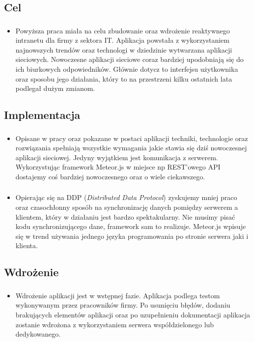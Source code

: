 \documentclass{beamer}
\newenvironment{justbe}%
{\setlength{\leftmargini}{0pt}\begin{itemize}\item[]}%
{\end{itemize}}
\begin{document}
\subsection{Cel}
\begin{frame}
 \frametitle{}
 \begin{justbe}
 Powyższa praca miała na celu zbudowanie oraz wdrożenie reaktywnego intranetu dla firmy z sektora IT. Aplikacja powstała z wykorzystaniem najnowszych trendów oraz technologi w dziedzinie wytwarzana aplikacji sieciowych. Nowoczesne aplikacji sieciowe coraz bardziej upodobniają się do ich biurkowych odpowiedników. Głównie dotycz to interfejsu użytkownika oraz sposobu jego działania, który to na przestrzeni kilku ostatnich lata podlegał dużym zmianom. 
 \end{justbe}
\end{frame}

\subsection{Implementacja}
\begin{frame}
 \frametitle{}
 \begin{justbe}
  Opisane w pracy oraz pokazane w postaci aplikacji techniki, technologie oraz rozwiązania spełniają wszystkie wymagania jakie stawia się dziś nowoczesnej aplikacji sieciowej. Jedyny wyjątkiem jest komunikacja z serwerem. Wykorzystując framework Meteor.js w miejsce np REST'owego API dostajemy coś bardziej nowoczesnego oraz o wiele ciekawszego. 
 \end{justbe}
\end{frame}

\begin{frame}
 \frametitle{}
 \begin{justbe}
  Opierając się na DDP (\textit{Distributed Data Protocol}) zyskujemy mniej praco oraz czasochłonny  sposób na synchronizację danych pomiędzy serwerem a klientem, który w działaniu jest bardzo spektakularny. Nie musimy pisać kodu synchronizującego dane, framework sam to realizuje. Meteor.js wpisuje się w trend używania jednego języka programowania po stronie serwera jaki i klienta.
 \end{justbe}
\end{frame}

\subsection{Wdrożenie}
\begin{frame}
 \frametitle{}
 \begin{justbe}
  Wdrożenie aplikacji jest w wstępnej fazie. Aplikacja podlega testom wykonywanym przez pracowników firmy. Po usunięciu błędów, dodaniu brakujących elementów aplikacji oraz po uzupełnieniu dokumentacji aplikacja zostanie wdrożona z wykorzystaniem serwera współdzielonego lub dedykowanego.
 \end{justbe}
\end{frame}

%   
\end{document}
